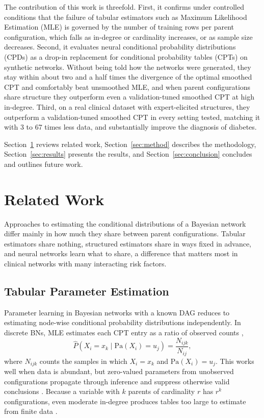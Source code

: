 \documentclass[a4paper,fleqn]{cas-dc}
\newcommand{\Pa}{\mathrm{Pa}}
\begin{document}
The contribution of this work is threefold. First, it confirms under controlled conditions that the failure of tabular estimators such as Maximum Likelihood Estimation (MLE) is governed by the number of training rows per parent configuration, which falls as in-degree or cardinality increases, or as sample size decreases. Second, it evaluates neural conditional probability distributions (CPDs) as a drop-in replacement for conditional probability tables (CPTs) on synthetic networks. Without being told how the networks were generated, they stay within about two and a half times the divergence of the optimal smoothed CPT and comfortably beat unsmoothed MLE, and when parent configurations share structure they outperform even a validation-tuned smoothed CPT at high in-degree. Third, on a real clinical dataset with expert-elicited structures, they outperform a validation-tuned smoothed CPT in every setting tested, matching it with 3 to 67 times less data, and substantially improve the diagnosis of diabetes.

Section~\ref{sec:related} reviews related work, Section~\ref{sec:method} describes the methodology, Section~\ref{sec:results} presents the results, and Section~\ref{sec:conclusion} concludes and outlines future work.

\section{Related Work}\label{sec:related}

Approaches to estimating the conditional distributions of a Bayesian network differ mainly in how much they share between parent configurations. Tabular estimators share nothing, structured estimators share in ways fixed in advance, and neural networks learn what to share, a difference that matters most in clinical networks with many interacting risk factors.

\subsection{Tabular Parameter Estimation}

Parameter learning in Bayesian networks with a known DAG reduces to estimating node-wise conditional probability distributions independently. In discrete BNs, MLE estimates each CPT entry as a ratio of observed counts \citep[Sec.~17.2]{koller2009probabilistic},
\begin{equation}
\hat{P}(X_i = x_k \mid \Pa(X_i)=u_j)=\frac{N_{ijk}}{N_{ij}},
\label{eq:mle}
\end{equation}
where $N_{ijk}$ counts the samples in which $X_i=x_k$ and $\Pa(X_i)=u_j$. This works well when data is abundant, but zero-valued parameters from unobserved configurations propagate through inference and suppress otherwise valid conclusions \citep{impact_oniko_2013}. Because a variable with $k$ parents of cardinality $r$ has $r^k$ configurations, even moderate in-degree produces tables too large to estimate from finite data \citep[Sec.~5.2]{learning_oniko_2001,koller2009probabilistic}.
\end{document}
